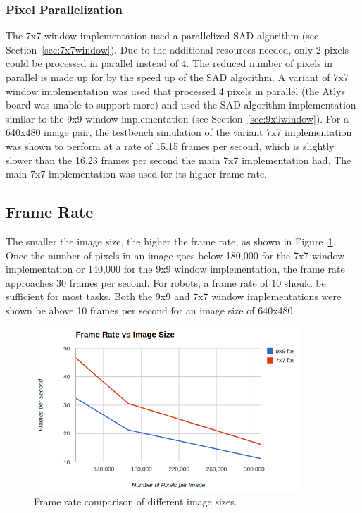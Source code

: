 \subsubsection{Pixel Parallelization}
\label{sec:7x7pixelParallel4}

The 7x7 window implementation used a parallelized SAD algorithm (see Section~\ref{sec:7x7window}). Due to the additional resources needed, only 2 pixels could be processed in parallel instead of 4. The reduced number of pixels in parallel is made up for by the speed up of the SAD algorithm. A variant of 7x7 window implementation was used that processed 4 pixels in parallel (the Atlys board was unable to support more) and used the SAD algorithm implementation similar to the 9x9 window implementation (see Section~\ref{sec:9x9window}). For a 640x480 image pair, the testbench simulation of the variant 7x7 implementation was shown to perform at a rate of 15.15 frames per second, which is slightly slower than the 16.23 frames per second the main 7x7 implementation had. The main 7x7 implementation was used for its higher frame rate.

\subsection{Frame Rate}
\label{sec:frameRate}

The smaller the image size, the higher the frame rate, as shown in Figure~\ref{fig:frameRate}. Once the number of pixels in an image goes below 180,000 for the 7x7 window implementation or 140,000 for the 9x9 window implementation, the frame rate approaches 30 frames per second. For robots, a frame rate of 10 should be sufficient for most tasks. Both the 9x9 and 7x7 window implementations were shown be above 10 frames per second for an image size of 640x480.

\begin{figure}[h]
	\begin{center}
		\includegraphics[width=100mm]{figures/frameRate.png}
		\captionfonts
		\caption{Frame rate comparison of different image sizes.}
		\label{fig:frameRate}
	\end{center}
\end{figure}

